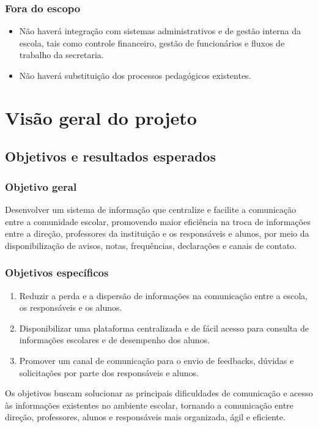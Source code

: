 \documentclass[a4paper,12pt]{report}
\begin{document}
\subsection{Fora do escopo}
\begin{itemize}
    \item Não haverá integração com sistemas administrativos e de gestão interna da escola, tais como controle financeiro, gestão de funcionários e fluxos de trabalho da secretaria.
    \item Não haverá substituição dos processos pedagógicos existentes.
\end{itemize}

\chapter{Visão geral do projeto}

\section{Objetivos e resultados esperados}

\subsection{Objetivo geral}
Desenvolver um sistema de informação que centralize e facilite a comunicação entre a comunidade escolar, promovendo maior eficiência na troca de informações entre a direção, professores da instituição e os responsáveis e alunos, por meio da disponibilização de avisos, notas, frequências, declarações e canais de contato.

\subsection{Objetivos específicos}
\begin{enumerate}
    \item Reduzir a perda e a dispersão de informações na comunicação entre a escola, os responsáveis e os alunos.
    \item Disponibilizar uma plataforma centralizada e de fácil acesso para consulta de informações escolares e de desempenho dos alunos.
    \item Promover um canal de comunicação para o envio de feedbacks, dúvidas e solicitações por parte dos responsáveis e alunos.
\end{enumerate}

Os objetivos buscam solucionar as principais dificuldades de comunicação e acesso às informações existentes no ambiente escolar, tornando a comunicação entre direção, professores, alunos e responsáveis mais organizada, ágil e eficiente.
\end{document}
